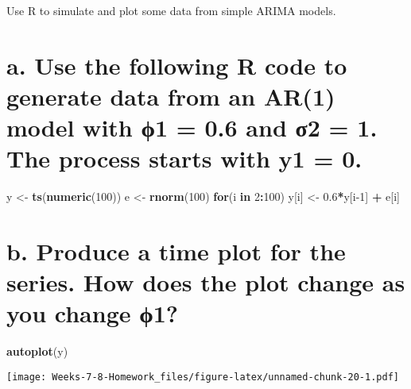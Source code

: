 \documentclass[]{article}
\newenvironment{Shaded}{\begin{snugshade}}{\end{snugshade}}
\newcommand{\ControlFlowTok}[1]{\textcolor[rgb]{0.13,0.29,0.53}{\textbf{#1}}}
\newcommand{\DecValTok}[1]{\textcolor[rgb]{0.00,0.00,0.81}{#1}}
\newcommand{\FloatTok}[1]{\textcolor[rgb]{0.00,0.00,0.81}{#1}}
\newcommand{\KeywordTok}[1]{\textcolor[rgb]{0.13,0.29,0.53}{\textbf{#1}}}
\newcommand{\NormalTok}[1]{#1}
\newcommand{\OperatorTok}[1]{\textcolor[rgb]{0.81,0.36,0.00}{\textbf{#1}}}
\newcommand{\StringTok}[1]{\textcolor[rgb]{0.31,0.60,0.02}{#1}}
\begin{document}
Use R to simulate and plot some data from simple ARIMA models.

\hypertarget{a.-use-the-following-r-code-to-generate-data-from-an-ar1-model-with-1-0.6-and-2-1.-the-process-starts-with-y1-0.}{%
\section{a. Use the following R code to generate data from an AR(1)
model with ϕ1 = 0.6 and σ2 = 1. The process starts with y1 =
0.}\label{a.-use-the-following-r-code-to-generate-data-from-an-ar1-model-with-1-0.6-and-2-1.-the-process-starts-with-y1-0.}}

\begin{Shaded}
\begin{Highlighting}[]
\NormalTok{y <-}\StringTok{ }\KeywordTok{ts}\NormalTok{(}\KeywordTok{numeric}\NormalTok{(}\DecValTok{100}\NormalTok{))}
\NormalTok{e <-}\StringTok{ }\KeywordTok{rnorm}\NormalTok{(}\DecValTok{100}\NormalTok{)}
\ControlFlowTok{for}\NormalTok{(i }\ControlFlowTok{in} \DecValTok{2}\OperatorTok{:}\DecValTok{100}\NormalTok{)}
\NormalTok{  y[i] <-}\StringTok{ }\FloatTok{0.6}\OperatorTok{*}\NormalTok{y[i}\DecValTok{-1}\NormalTok{] }\OperatorTok{+}\StringTok{ }\NormalTok{e[i]}
\end{Highlighting}
\end{Shaded}

\hypertarget{b.-produce-a-time-plot-for-the-series.-how-does-the-plot-change-as-you-change-1}{%
\section{b. Produce a time plot for the series. How does the plot change
as you change
ϕ1?}\label{b.-produce-a-time-plot-for-the-series.-how-does-the-plot-change-as-you-change-1}}

\begin{Shaded}
\begin{Highlighting}[]
\KeywordTok{autoplot}\NormalTok{(y)}
\end{Highlighting}
\end{Shaded}

\texttt{[image: Weeks-7-8-Homework\_files/figure-latex/unnamed-chunk-20-1.pdf]}
\end{document}

